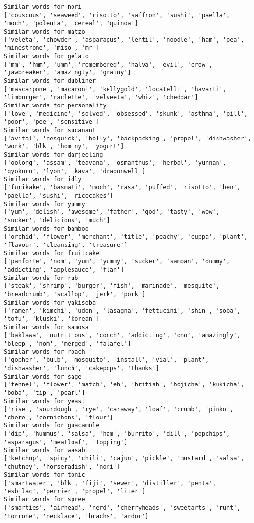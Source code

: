 \documentclass[11pt]{article}
\begin{document}
\begin{Verbatim}[commandchars=\\\{\}]
Similar words for nori
['couscous', 'seaweed', 'risotto', 'saffron', 'sushi', 'paella', 'moch', 'polenta', 'cereal', 'quinoa']
Similar words for matzo
['veleta', 'chowder', 'asparagus', 'lentil', 'noodle', 'ham', 'pea', 'minestrone', 'miso', 'mr']
Similar words for gelato
['mm', 'hmm', 'umm', 'remembered', 'halva', 'evil', 'crow', 'jawbreaker', 'amazingly', 'grainy']
Similar words for dubliner
['mascarpone', 'macaroni', 'kellygold', 'locatelli', 'havarti', 'limburger', 'raclette', 'velveeta', 'whiz', 'cheddar']
Similar words for personality
['love', 'medicine', 'solved', 'obsessed', 'skunk', 'asthma', 'pill', 'poor', 'pee', 'sensitive']
Similar words for sucanant
['avital', 'nesquick', 'holly', 'backpacking', 'propel', 'dishwasher', 'work', 'blk', 'hominy', 'yogurt']
Similar words for darjeeling
['oolong', 'assam', 'teavana', 'osmanthus', 'herbal', 'yunnan', 'gyokuro', 'lyon', 'kava', 'dragonwell']
Similar words for idly
['furikake', 'basmati', 'moch', 'rasa', 'puffed', 'risotto', 'ben', 'paella', 'sushi', 'ricecakes']
Similar words for yummy
['yum', 'delish', 'awesome', 'father', 'god', 'tasty', 'wow', 'sucker', 'delicious', 'much']
Similar words for bamboo
['orchid', 'flower', 'merchant', 'title', 'peachy', 'cuppa', 'plant', 'flavour', 'cleansing', 'treasure']
Similar words for fruitcake
['panforte', 'nom', 'yum', 'yummy', 'sucker', 'samoan', 'dummy', 'addicting', 'applesauce', 'flan']
Similar words for rub
['steak', 'shrimp', 'burger', 'fish', 'marinade', 'mesquite', 'breadcrumb', 'scallop', 'jerk', 'pork']
Similar words for yakisoba
['ramen', 'kimchi', 'udon', 'lasagna', 'fettucini', 'shin', 'soba', 'tofu', 'kluski', 'korean']
Similar words for samosa
['baklawa', 'nutritious', 'conch', 'addicting', 'ono', 'amazingly', 'bleep', 'nom', 'merged', 'falafel']
Similar words for roach
['gopher', 'bulb', 'mosquito', 'install', 'vial', 'plant', 'dishwasher', 'lunch', 'cakepops', 'thanks']
Similar words for sage
['fennel', 'flower', 'match', 'eh', 'british', 'hojicha', 'kukicha', 'boba', 'tip', 'pearl']
Similar words for yeast
['rise', 'sourdough', 'rye', 'caraway', 'loaf', 'crumb', 'pinko', 'chere', 'cornichons', 'flour']
Similar words for guacamole
['dip', 'hummus', 'salsa', 'ham', 'burrito', 'dill', 'popchips', 'asparagus', 'meatloaf', 'topping']
Similar words for wasabi
['ketchup', 'spicy', 'chili', 'cajun', 'pickle', 'mustard', 'salsa', 'chutney', 'horseradish', 'nori']
Similar words for tonic
['smartwater', 'blk', 'fiji', 'sewer', 'distiller', 'penta', 'esbilac', 'perrier', 'propel', 'liter']
Similar words for spree
['smarties', 'airhead', 'nerd', 'cherryheads', 'sweetarts', 'runt', 'torrone', 'necklace', 'brachs', 'ardor']

\end{Verbatim}
\end{document}
